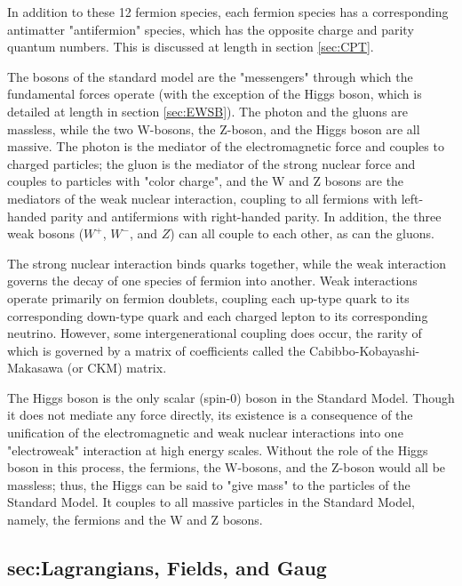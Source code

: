 In addition to these 12 fermion species, each fermion species has a corresponding antimatter "antifermion" species, which has the opposite charge and parity quantum numbers. This is discussed at length in section \ref{sec:CPT}.

The bosons of the standard model are the "messengers" through which the fundamental forces operate (with the exception of the Higgs boson, which is detailed at length in section \ref{sec:EWSB}). The photon and the gluons are massless, while the two W-bosons, the Z-boson, and the Higgs boson are all massive. The photon is the mediator of the electromagnetic force and couples to charged particles; the gluon is the mediator of the strong nuclear force and couples to particles with "color charge", and the W and Z bosons are the mediators of the weak nuclear interaction, coupling to all fermions with left-handed parity and antifermions with right-handed parity. In addition, the three weak bosons ($W^{+}$, $W^{-}$, and $Z$) can all couple to each other, as can the gluons.

The strong nuclear interaction binds quarks together, while the weak interaction governs the decay of one species of fermion into another. Weak interactions operate primarily on fermion doublets, coupling each up-type quark to its corresponding down-type quark and each charged lepton to its corresponding neutrino. However, some intergenerational coupling does occur, the rarity of which is governed by a matrix of coefficients called the Cabibbo-Kobayashi-Makasawa (or CKM) matrix. 

The Higgs boson is the only scalar (spin-0) boson in the Standard Model. Though it does not mediate any force directly, its existence is a consequence of the unification of the electromagnetic and weak nuclear interactions into one "electroweak" interaction at high energy scales. Without the role of the Higgs boson in this process, the fermions, the W-bosons, and the Z-boson would all be massless; thus, the Higgs can be said to "give mass" to the particles of the Standard Model. It couples to all massive particles in the Standard Model, namely, the fermions and the W and Z bosons.

\subsection{sec:Lagrangians, Fields, and Gaug}

